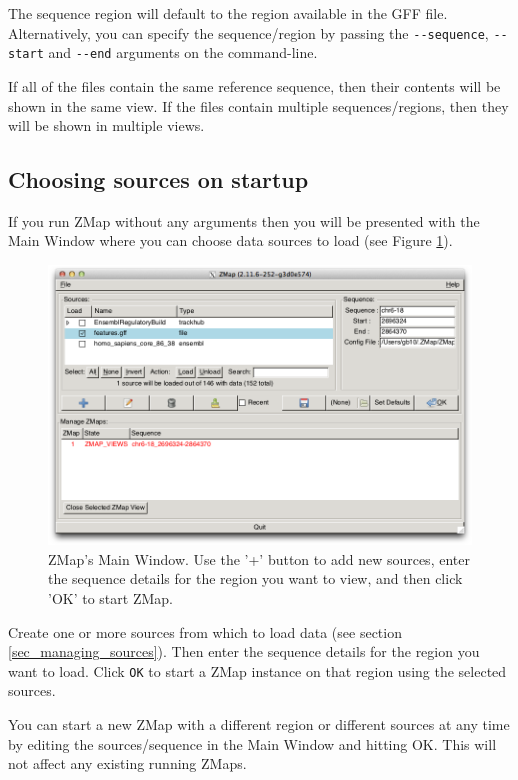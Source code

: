 \documentclass[letterpaper]{article}
\newcounter{Figure}
\begin{document}
The sequence region will default to the region available in the GFF file. Alternatively, you can specify the sequence/region by passing the \lstinline{--sequence}, \lstinline{--start} and \lstinline{--end} arguments on the command-line.

If all of the files contain the same reference sequence, then their contents will be shown in the same view. If the files contain multiple sequences/regions, then they will be shown in multiple views.

\subsection{Choosing sources on startup}
If you run ZMap without any arguments then you will be presented with the Main
Window where you can choose data sources to load (see Figure
\ref{img_main_window}).

\begin{figure}
\centering
\color[rgb]{0.30980393,0.5058824,0.7411765}
\includegraphics[resolution=150]{images/main_window.png}
\caption{ZMap's Main Window. Use the '+' button to add new sources, enter the sequence details for the region you want to view, and then click 'OK' to start ZMap.}
\label{img_main_window}
\end{figure}

Create one or more sources from which to load data (see section \ref{sec_managing_sources}). Then enter the sequence details for the region you want to load. Click \lstinline{OK} to start a ZMap instance on that region using the selected sources.

You can start a new ZMap with a different region or different sources at any time by editing the sources/sequence in the Main Window and hitting OK. This will not affect any existing running ZMaps.
\end{document}
